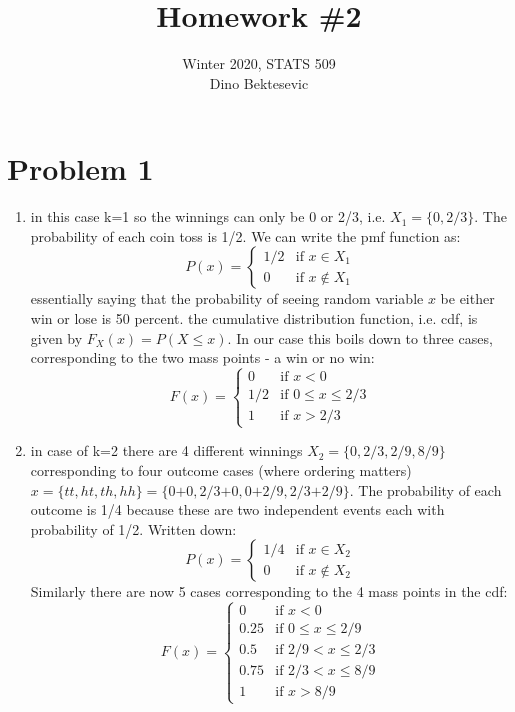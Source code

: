 \documentclass{article}
\date{{}}
\newcommand{\1}{\mathbf{1}}
\begin{document}
\title{Homework \#2}
\author{\normalsize{Winter 2020, STATS 509}\\
\normalsize{Dino Bektesevic}}
\maketitle

\section*{Problem 1}
\begin{enumerate}
	\item in this case k=1 so the winnings can only be 0 or 2/3, i.e. $X_1=\{0, 2/3\}$. The probability of each coin toss is 1/2. We can write the pmf function as:
	$$P(x) = \begin{cases} 
	        1/2 &\mbox{if } x \in X_1 \\
            0 & \mbox{if } x \notin X_1 
        \end{cases} 
    $$
    essentially saying that the probability of seeing random variable $x$ be either win or lose is 50 percent. the cumulative distribution function, i.e. cdf, is given by $F_X(x) = P(X\leq x)$. In our case this boils down to three cases, corresponding to the two mass points - a win or no win:
	$$F(x) = \begin{cases} 
	        0 &\mbox{if } x < 0 \\
	        1/2 &\mbox{if } 0 \leq x \leq 2/3 \\
            1 & \mbox{if } x > 2/3 
        \end{cases} 
    $$

    \item in case of k=2 there are 4 different winnings $X_2=\{0, 2/3, 2/9, 8/9\}$ corresponding to four outcome cases (where ordering matters) $x=\{tt, ht, th, hh\} = \{\mbox{0+0}, \mbox{2/3+0}, \mbox{0+2/9}, \mbox{2/3+2/9}\}$. The probability of each outcome is 1/4 because these are two independent events each with probability of 1/2. Written down:
    $$P(x) = \begin{cases} 
	        1/4 &\mbox{if } x \in X_2 \\
            0 & \mbox{if } x \notin X_2 
        \end{cases} 
    $$
	Similarly there are now 5 cases corresponding to the 4 mass points in the cdf:
	$$F(x) = \begin{cases} 
	        0 &\mbox{if } x < 0 \\
	        0.25 &\mbox{if } 0\leq x \leq 2/9 \\
            0.5  & \mbox{if } 2/9 < x \leq 2/3 \\
            0.75 & \mbox{if } 2/3 < x \leq 8/9 \\
            1 & \mbox{if } x > 8/9
        \end{cases} 
    $$
	

\end{enumerate}
\end{document}
